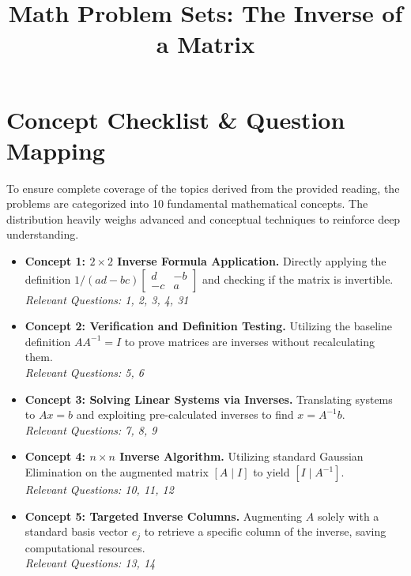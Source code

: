 \documentclass{article}
\title{Math Problem Sets: The Inverse of a Matrix}
\author{}
\date{}
\begin{document}
\maketitle

\tableofcontents
\newpage

\section{Concept Checklist \& Question Mapping}

To ensure complete coverage of the topics derived from the provided reading, the problems are categorized into 10 fundamental mathematical concepts. The distribution heavily weighs advanced and conceptual techniques to reinforce deep understanding.

\begin{itemize}
    \item \textbf{Concept 1: $2 \times 2$ Inverse Formula Application.} Directly applying the definition $1/(ad-bc) \begin{bmatrix} d & -b \\ -c & a \end{bmatrix}$ and checking if the matrix is invertible. \\
    \textit{Relevant Questions: 1, 2, 3, 4, 31}
    
    \item \textbf{Concept 2: Verification and Definition Testing.} Utilizing the baseline definition $AA^{-1} = I$ to prove matrices are inverses without recalculating them. \\
    \textit{Relevant Questions: 5, 6}
    
    \item \textbf{Concept 3: Solving Linear Systems via Inverses.} Translating systems to $Ax = b$ and exploiting pre-calculated inverses to find $x = A^{-1}b$. \\
    \textit{Relevant Questions: 7, 8, 9}
    
    \item \textbf{Concept 4: $n \times n$ Inverse Algorithm.} Utilizing standard Gaussian Elimination on the augmented matrix $[A \mid I]$ to yield $[I \mid A^{-1}]$. \\
    \textit{Relevant Questions: 10, 11, 12}
    
    \item \textbf{Concept 5: Targeted Inverse Columns.} Augmenting $A$ solely with a standard basis vector $e_j$ to retrieve a specific column of the inverse, saving computational resources. \\
    \textit{Relevant Questions: 13, 14}
    

\end{itemize}
\end{document}

